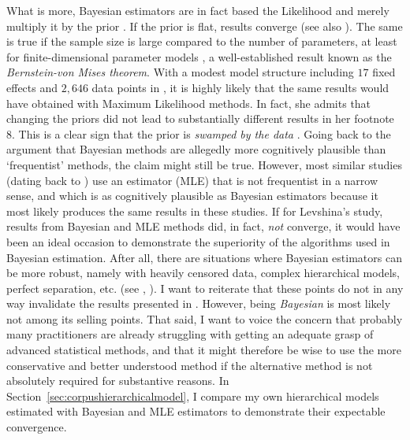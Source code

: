 \documentclass[USenglish]{article}
\begin{document}
What is more, Bayesian estimators are in fact based the Likelihood and merely multiply it by the prior \citep[6--8]{GelmanEa2014}.
If the prior is flat, results converge (see also \citealp[347]{GelmanHill2006}).
The same is true if the sample size is large compared to the number of parameters, at least for finite-dimensional parameter models \citep[1119--1120]{Freedman1999}, a well-established result known as the \textit{Bernstein-von Mises theorem}.
With a modest model structure including $17$ fixed effects and $2,646$ data points in \cite{Levshina2016}, it is highly likely that the same results would have obtained with Maximum Likelihood methods.
In fact, she admits that changing the priors did not lead to substantially different results in her footnote 8.
This is a clear sign that the prior is \textit{swamped by the data} \citep[1119]{Freedman1999}.
Going back to the argument that Bayesian methods are allegedly more cognitively plausible than `frequentist' methods, the claim might still be true.
However, most similar studies (dating back to \citealp{BresnanEa2007}) use an estimator (MLE) that is not frequentist in a narrow sense, and which is as cognitively plausible as Bayesian estimators because it most likely produces the same results in these studies.
If for Levshina's study, results from Bayesian and MLE methods did, in fact, \textit{not} converge, it would have been an ideal occasion to demonstrate the superiority of the algorithms used in Bayesian estimation.
After all, there are situations where Bayesian estimators can be more robust, namely with heavily censored data, complex hierarchical models, perfect separation, etc. (see \citealp{Freedman1999}, \citealp[345--348]{GelmanHill2006}).
I want to reiterate that these points do not in any way invalidate the results presented in \cite{Levshina2016}.
However, being \textit{Bayesian} is most likely not among its selling points.
That said, I want to voice the concern that probably many practitioners are already struggling with getting an adequate grasp of advanced statistical methods, and that it might therefore be wise to use the more conservative and better understood method if the alternative method is not absolutely required for substantive reasons.
In Section~\ref{sec:corpushierarchicalmodel}, I compare my own hierarchical models estimated with Bayesian and MLE estimators to demonstrate their expectable convergence.


\end{document}
